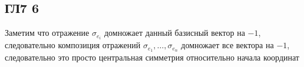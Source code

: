 \subsection*{ГЛ7 6}
Заметим что отражение $\sigma_{e_i}$ домножает данный базисный вектор на $-1$, следовательно композиция отражений $\sigma_{e_1},\ldots ,\sigma_{e_n}$ домножает все вектора на $-1$, следовательно это просто центральная симметрия относительно начала координат 
		